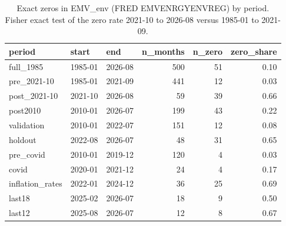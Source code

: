\begin{table}
\caption{Exact zeros in EMV\_env (FRED EMVENRGYENVREG) by period. Fisher exact test of the zero rate 2021-10 to 2026-08 versus 1985-01 to 2021-09.}
\label{tab:m1_zeros}
\begin{tabular}{lllrrr}
\toprule
period & start & end & n\_months & n\_zero & zero\_share \\
\midrule
full\_1985 & 1985-01 & 2026-08 & 500 & 51 & 0.10 \\
pre\_2021-10 & 1985-01 & 2021-09 & 441 & 12 & 0.03 \\
post\_2021-10 & 2021-10 & 2026-08 & 59 & 39 & 0.66 \\
post2010 & 2010-01 & 2026-07 & 199 & 43 & 0.22 \\
validation & 2010-01 & 2022-07 & 151 & 12 & 0.08 \\
holdout & 2022-08 & 2026-07 & 48 & 31 & 0.65 \\
pre\_covid & 2010-01 & 2019-12 & 120 & 4 & 0.03 \\
covid & 2020-01 & 2021-12 & 24 & 4 & 0.17 \\
inflation\_rates & 2022-01 & 2024-12 & 36 & 25 & 0.69 \\
last18 & 2025-02 & 2026-07 & 18 & 9 & 0.50 \\
last12 & 2025-08 & 2026-07 & 12 & 8 & 0.67 \\
\bottomrule
\end{tabular}
\end{table}
